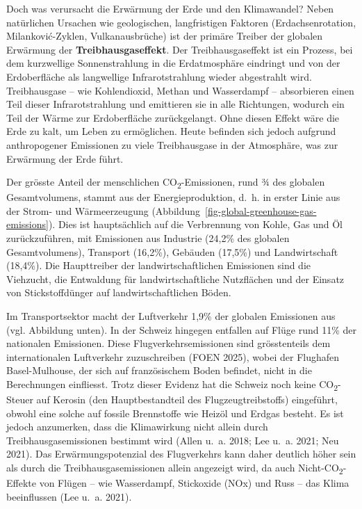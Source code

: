 \documentclass[
  nswissgerman,
  a4paper,
  openany]{book}
\begin{document}
Doch was verursacht die Erwärmung der Erde und den Klimawandel? Neben
natürlichen Ursachen wie geologischen, langfristigen Faktoren
(Erdachsenrotation, Milanković-Zyklen, Vulkanausbrüche) ist der primäre
Treiber der globalen Erwärmung der \textbf{Treibhausgaseffekt}. Der
Treibhausgaseffekt ist ein Prozess, bei dem kurzwellige Sonnenstrahlung
in die Erdatmosphäre eindringt und von der Erdoberfläche als langwellige
Infrarotstrahlung wieder abgestrahlt wird. Treibhausgase -- wie
Kohlendioxid, Methan und Wasserdampf -- absorbieren einen Teil dieser
Infrarotstrahlung und emittieren sie in alle Richtungen, wodurch ein
Teil der Wärme zur Erdoberfläche zurückgelangt. Ohne diesen Effekt wäre
die Erde zu kalt, um Leben zu ermöglichen. Heute befinden sich jedoch
aufgrund anthropogener Emissionen zu viele Treibhausgase in der
Atmosphäre, was zur Erwärmung der Erde führt.

Der grösste Anteil der menschlichen CO\textsubscript{2}-Emissionen, rund
¾ des globalen Gesamtvolumens, stammt aus der Energieproduktion, d.~h.
in erster Linie aus der Strom- und Wärmeerzeugung
(Abbildung~\ref{fig-global-greenhouse-gas-emissions}). Dies ist
hauptsächlich auf die Verbrennung von Kohle, Gas und Öl zurückzuführen,
mit Emissionen aus Industrie (24,2\% des globalen Gesamtvolumens),
Transport (16,2\%), Gebäuden (17,5\%) und Landwirtschaft (18,4\%). Die
Haupttreiber der landwirtschaftlichen Emissionen sind die Viehzucht, die
Entwaldung für landwirtschaftliche Nutzflächen und der Einsatz von
Stickstoffdünger auf landwirtschaftlichen Böden.

Im Transportsektor macht der Luftverkehr 1,9\% der globalen Emissionen
aus (vgl. Abbildung unten). In der Schweiz hingegen entfallen auf Flüge
rund 11\% der nationalen Emissionen. Diese Flugverkehrsemissionen sind
grösstenteils dem internationalen Luftverkehr zuzuschreiben (FOEN 2025),
wobei der Flughafen Basel-Mulhouse, der sich auf französischem Boden
befindet, nicht in die Berechnungen einfliesst. Trotz dieser Evidenz hat
die Schweiz noch keine CO\textsubscript{2}-Steuer auf Kerosin (den
Hauptbestandteil des Flugzeugtreibstoffs) eingeführt, obwohl eine solche
auf fossile Brennstoffe wie Heizöl und Erdgas besteht. Es ist jedoch
anzumerken, dass die Klimawirkung nicht allein durch
Treibhausgasemissionen bestimmt wird (Allen u.~a. 2018; Lee u.~a. 2021;
Neu 2021). Das Erwärmungspotenzial des Flugverkehrs kann daher deutlich
höher sein als durch die Treibhausgasemissionen allein angezeigt wird,
da auch Nicht-CO\textsubscript{2}-Effekte von Flügen -- wie Wasserdampf,
Stickoxide (NOx) und Russ -- das Klima beeinflussen (Lee u.~a. 2021).
\end{document}
